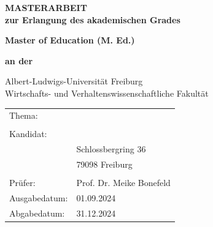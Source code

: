\thispagestyle{empty}
{
	\setlength{\parskip}{1cm}
	\begin{center}
		\vspace*{1cm}
		\textbf{\Huge MASTERARBEIT}
		\vspace{2cm}\\
		
		\textbf{zur Erlangung des akademischen Grades}
		
		\textbf{\Large Master of Education (M. Ed.)}
		
		\textbf{an der}
		
		{\huge Albert-Ludwigs-Universität Freiburg}\\
		
		{\Large Wirtschafts- und Verhaltenswissenschaftliche Fakultät}
		\vspace{1cm}
		
		\begin{tabular}{p{4cm} p{10cm}}
			Thema: & \thetitle \\&\\
			Kandidat: & \theauthor \\
			& Schlossbergring 36 \\
			& 79098 Freiburg \\&\\
			Prüfer: & Prof. Dr. Meike Bonefeld \\
			Ausgabedatum: & 01.09.2024 \\
			Abgabedatum: & 31.12.2024 \\
		\end{tabular}
	\end{center}
}
\newpage



